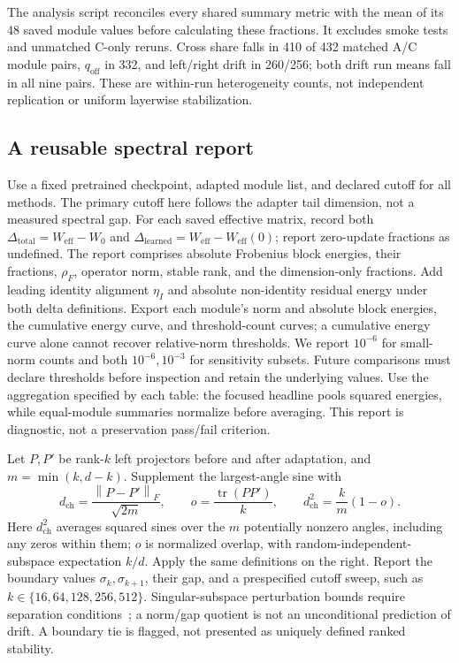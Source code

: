 \documentclass{article}
\newcommand{\off}{\mathrm{off}}
\newcommand{\fro}[1]{\left\|#1\right\|_F}
\begin{document}
The analysis script reconciles every shared summary metric with the mean of its 48 saved module values before calculating these fractions. It excludes smoke tests and unmatched C-only reruns. Cross share falls in 410 of 432 matched A/C module pairs, $q_{\off}$ in 332, and left/right drift in 260/256; both drift run means fall in all nine pairs. These are within-run heterogeneity counts, not independent replication or uniform layerwise stabilization.

\subsection{A reusable spectral report}
\label{app:reportcard}
Use a fixed pretrained checkpoint, adapted module list, and declared cutoff for all methods. The primary cutoff here follows the adapter tail dimension, not a measured spectral gap. For each saved effective matrix, record both $\Delta_{\mathrm{total}}=W_{\mathrm{eff}}-W_0$ and $\Delta_{\mathrm{learned}}=W_{\mathrm{eff}}-W_{\mathrm{eff}}(0)$; report zero-update fractions as undefined. The report comprises absolute Frobenius block energies, their fractions, $\rho_F$, operator norm, stable rank, and the dimension-only fractions. Add leading identity alignment $\eta_I$ and absolute non-identity residual energy under both delta definitions. Export each module's norm and absolute block energies, the cumulative energy curve, and threshold-count curves; a cumulative energy curve alone cannot recover relative-norm thresholds. We report $10^{-6}$ for small-norm counts and both $10^{-6},10^{-3}$ for sensitivity subsets. Future comparisons must declare thresholds before inspection and retain the underlying values. Use the aggregation specified by each table: the focused headline pools squared energies, while equal-module summaries normalize before averaging. This report is diagnostic, not a preservation pass/fail criterion.

Let $P,P'$ be rank-$k$ left projectors before and after adaptation, and $m=\min(k,d-k)$. Supplement the largest-angle sine with
\begin{equation}
d_{\mathrm{ch}}=\frac{\fro{P-P'}}{\sqrt{2m}},\qquad
o=\frac{\operatorname{tr}(PP')}{k},\qquad
d_{\mathrm{ch}}^2=\frac{k}{m}(1-o).
\label{eq:chordal}
\end{equation}
Here $d_{\mathrm{ch}}^2$ averages squared sines over the $m$ potentially nonzero angles, including any zeros within them; $o$ is normalized overlap, with random-independent-subspace expectation $k/d$. Apply the same definitions on the right. Report the boundary values $\sigma_k,\sigma_{k+1}$, their gap, and a prespecified cutoff sweep, such as $k\in\{16,64,128,256,512\}$. Singular-subspace perturbation bounds require separation conditions~\citep{wedin1972perturbation}; a norm/gap quotient is not an unconditional prediction of drift. A boundary tie is flagged, not presented as uniquely defined ranked stability.
\end{document}
